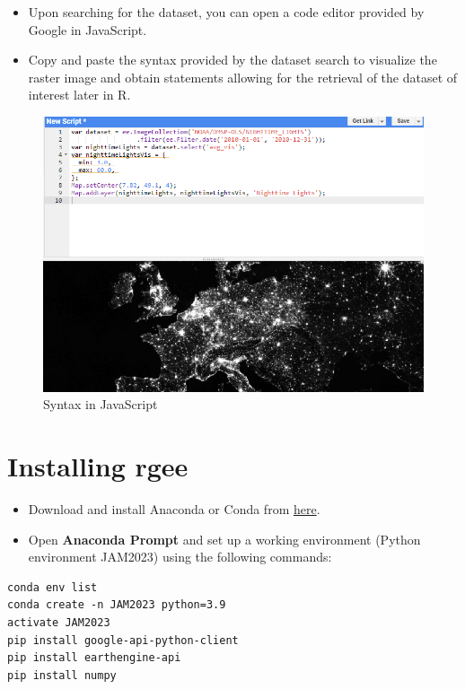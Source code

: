 \documentclass[
  12pt,
]{book}
\begin{document}
\begin{itemize}
\item
  Upon searching for the dataset, you can open a code editor provided by Google in JavaScript.
\item
  Copy and paste the syntax provided by the dataset search to visualize the raster image and obtain statements allowing for the retrieval of the dataset of interest later in R.
\end{itemize}

\begin{figure}
\centering
\includegraphics{Recursos/01_Session1/02_query.png}
\caption{Syntax in JavaScript}
\end{figure}

\hypertarget{installing-rgee}{%
\section{Installing rgee}\label{installing-rgee}}

\begin{itemize}
\item
  Download and install Anaconda or Conda from \href{https://www.anaconda.com/products/individual}{here}.
\item
  Open \textbf{Anaconda Prompt} and set up a working environment (Python environment JAM2023) using the following commands:
\end{itemize}

\begin{verbatim}
conda env list
conda create -n JAM2023 python=3.9
activate JAM2023
pip install google-api-python-client
pip install earthengine-api
pip install numpy
\end{verbatim}
\end{document}
